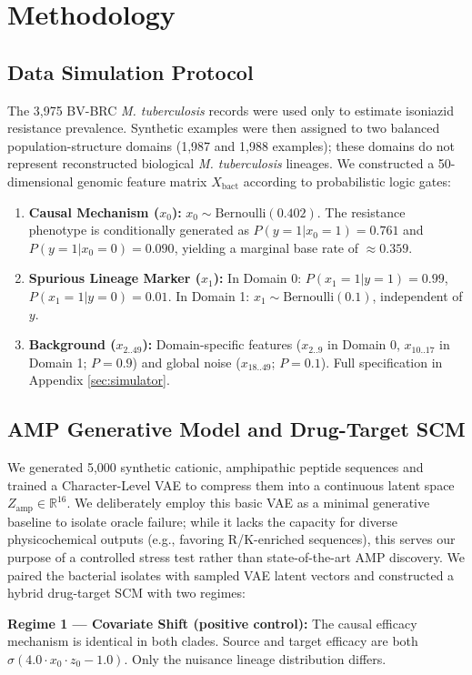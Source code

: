 \documentclass{article}
\begin{document}
\section{Methodology}
\subsection{Data Simulation Protocol}
The 3,975 BV-BRC \textit{M. tuberculosis} records were used only to estimate isoniazid resistance prevalence. Synthetic examples were then assigned to two balanced population-structure domains (1,987 and 1,988 examples); these domains do not represent reconstructed biological \textit{M. tuberculosis} lineages. We constructed a 50-dimensional genomic feature matrix $X_{\text{bact}}$ according to probabilistic logic gates:
\begin{enumerate}
    \item \textbf{Causal Mechanism ($x_0$):} $x_0 \sim \text{Bernoulli}(0.402)$. The resistance phenotype is conditionally generated as $P(y=1 | x_0=1) = 0.761$ and $P(y=1 | x_0=0) = 0.090$, yielding a marginal base rate of $\approx 0.359$.
    \item \textbf{Spurious Lineage Marker ($x_1$):} In Domain 0: $P(x_1{=}1|y{=}1)=0.99$, $P(x_1{=}1|y{=}0)=0.01$. In Domain 1: $x_1 \sim \text{Bernoulli}(0.1)$, independent of $y$.
    \item \textbf{Background ($x_{2..49}$):} Domain-specific features ($x_{2..9}$ in Domain 0, $x_{10..17}$ in Domain 1; $P=0.9$) and global noise ($x_{18..49}$; $P=0.1$). Full specification in Appendix \ref{sec:simulator}.
\end{enumerate}

\subsection{AMP Generative Model and Drug-Target SCM}
We generated 5,000 synthetic cationic, amphipathic peptide sequences and trained a Character-Level VAE to compress them into a continuous latent space $Z_{\text{amp}} \in \mathbb{R}^{16}$. We deliberately employ this basic VAE as a minimal generative baseline to isolate oracle failure; while it lacks the capacity for diverse physicochemical outputs (e.g., favoring R/K-enriched sequences), this serves our purpose of a controlled stress test rather than state-of-the-art AMP discovery. We paired the bacterial isolates with sampled VAE latent vectors and constructed a hybrid drug-target SCM with two regimes:

\textbf{Regime 1 --- Covariate Shift (positive control):} The causal efficacy mechanism is identical in both clades. Source and target efficacy are both $\sigma(4.0 \cdot x_0 \cdot z_0 - 1.0)$. Only the nuisance lineage distribution differs.
\end{document}
